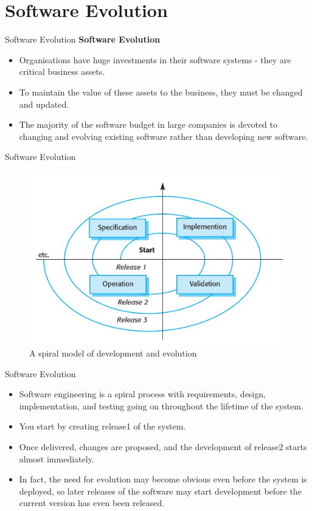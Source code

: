 \documentclass{beamer}
\begin{document}
\section{Software Evolution}
\begin{frame}{Software Evolution}
	\textbf{Software Evolution}
	\begin{itemize}
		\item Organisations have huge investments in their 
		software systems - they are critical business 
		assets.
		\item To maintain the value of these assets to the 
		business, they must be changed and updated.
		\item The majority of the software budget in large 
		companies is devoted to changing and 
		evolving existing software rather than 
		developing new software.
	\end{itemize}
\end{frame}
\begin{frame}{Software Evolution}
	\begin{figure}
	\includegraphics[scale=.43]{img/m3_47}
	\caption{A spiral 
		model of development 
		and evolution }
\end{figure}
\end{frame}
\begin{frame}{Software Evolution}
	\begin{itemize}
		\item Software engineering is a spiral process with requirements, design, implementation, and testing going on throughout the lifetime of the system.
		\item You start by creating release1 of the system.
		\item Once  delivered, changes are proposed, and the development of release2 starts almost immediately.
		\item In fact, the need for evolution may become obvious even before the system is deployed, so later releases of the software may start development before the current version has even been released.
		
	\end{itemize}
\end{frame}
\end{document}
